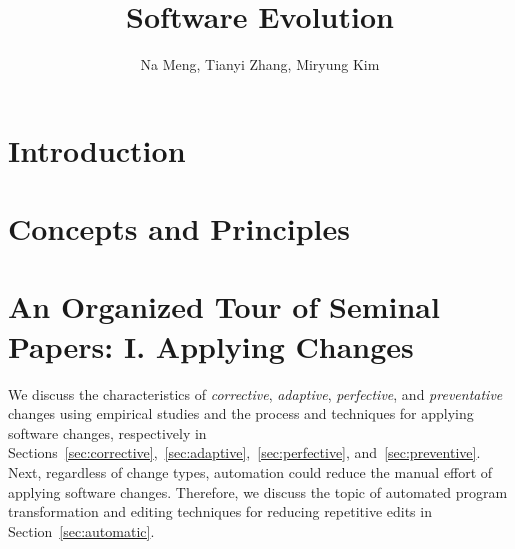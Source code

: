 \documentclass[runningheads,a4paper]{llncs}
\begin{document}
\mainmatter  %

\title{Software Evolution} 


%
%
\author{Na Meng, Tianyi Zhang, Miryung Kim} 



\maketitle


\begin{abstract}

\end{abstract}

\section{Introduction}


\section{Concepts and Principles}
\label{sec:concepts}
\label{sec:classification} 


\section{An Organized Tour of Seminal Papers: I. Applying Changes}
\label{sec:apply}

We discuss the characteristics of {\em corrective}, {\em adaptive}, {\em perfective}, and {\em preventative} changes using empirical studies and the process and techniques for applying software changes, respectively in Sections~\ref{sec:corrective},~\ref{sec:adaptive},~\ref{sec:perfective}, and~\ref{sec:preventive}. Next, regardless of change types, automation could reduce the manual effort of applying software changes. Therefore, we discuss the topic of automated program transformation and editing techniques for reducing repetitive edits in Section~\ref{sec:automatic}.
\end{document}
